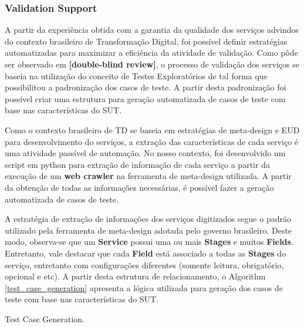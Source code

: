 \subsubsection{Validation Support}
\label{sec:teste}

A partir da experiência obtida com a garantia da qualidade dos serviços advindos do contexto brasileiro de Transformação Digital, foi possível definir estratégias automatizadas para maximizar a eficiência da atividade de validação. Como pôde ser observado em \textbf{[double-blind review]}, o processo de validação dos serviços se baseia na utilização do conceito de Testes Exploratórios de tal forma que possibilitou a padronização dos casos de teste. A partir desta padronização foi possível criar uma estrutura para geração automatizada de casos de teste com base nas características do SUT.

Como o contexto brasileiro de TD se baseia em estratégias de meta-design e EUD para desenvolvimento do serviços, a extração das características de cada serviço é uma atividade passível de automação. No nosso contexto, foi desenvolvido um script em python para extração de informação de cada serviço a partir da execução de um \textbf{web crawler} na ferramenta de meta-design utilizada. A partir da obtenção de todas as informações necessárias, é possível fazer a geração automatizada de casos de teste.

A estratégia de extração de informações dos serviços digitizados segue o padrão utilizado pela ferramenta de meta-design adotada pelo governo brasileiro. Deste modo, observa-se que um \textbf{Service} possui uma ou mais \textbf{Stages} e muitos \textbf{Fields}. Entretanto, vale destacar que cada \textbf{Field} está associado a todas as \textbf{Stages} do serviço, entretanto com configurações diferentes (somente leitura, obrigatório, opcional e etc). A partir desta estrutura de relacionamento, o Algorithm \ref{test_case_generation} apresenta a lógica utilizada para geração dos casos de teste com base nas características do SUT.

    \begin{algorithm}[!htb]


\caption{Test Case Generation.}
\label{test_case_generation}
\end{algorithm}


